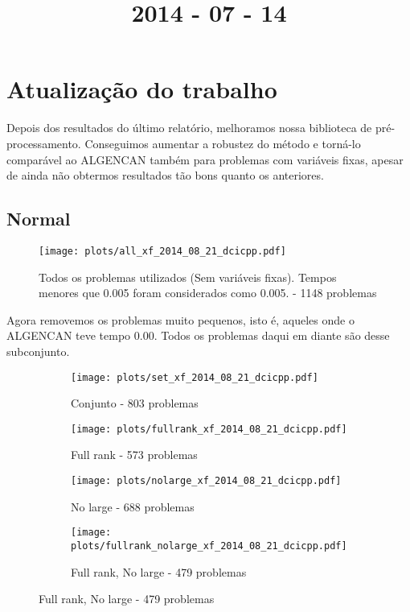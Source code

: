 \documentclass{article}
\title{2014 - 07 - 14}
\author{}
\date{}
\begin{document}
\maketitle
\section{Atualização do trabalho}

Depois dos resultados do último relatório, melhoramos nossa biblioteca de
pré-processamento. Conseguimos aumentar a robustez do método e torná-lo
comparável ao ALGENCAN também para problemas com variáveis fixas, apesar de
ainda não obtermos resultados tão bons quanto os anteriores.

\subsection{Normal}

\begin{figure}[H]
  \centering
  \texttt{[image: plots/all\_xf\_2014\_08\_21\_dcicpp.pdf]}
  \caption{Todos os problemas utilizados (Sem variáveis fixas). Tempos
    menores que 0.005 foram considerados como 0.005. - 1148 problemas}
\end{figure}
Agora removemos os problemas muito pequenos, isto é, aqueles onde o
ALGENCAN teve tempo 0.00. Todos os problemas daqui em diante são desse
subconjunto.

\begin{figure}[H]
  \centering
  \begin{subfigure}{0.48\textwidth}
    \texttt{[image: plots/set\_xf\_2014\_08\_21\_dcicpp.pdf]}
    \caption{Conjunto - 803 problemas}
  \end{subfigure}
  \begin{subfigure}{0.48\textwidth}
    \texttt{[image: plots/fullrank\_xf\_2014\_08\_21\_dcicpp.pdf]}
    \caption{Full rank - 573 problemas}
  \end{subfigure}
  \begin{subfigure}{0.48\textwidth}
    \texttt{[image: plots/nolarge\_xf\_2014\_08\_21\_dcicpp.pdf]}
    \caption{No large - 688 problemas}
  \end{subfigure}
  \begin{subfigure}{0.48\textwidth}
    \texttt{[image: plots/fullrank\_nolarge\_xf\_2014\_08\_21\_dcicpp.pdf]}
    \caption{Full rank, No large - 479 problemas}
  \end{subfigure}
\end{figure}
\end{document}
